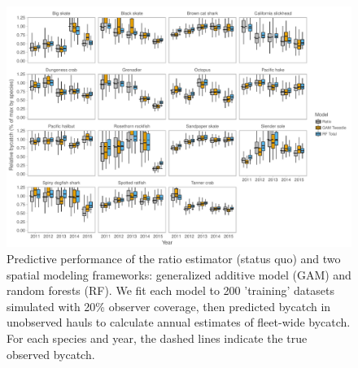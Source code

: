 \documentclass[]{article}
\begin{document}
\begin{landscape}
\begin{figure}

{\centering \includegraphics[width=10in]{bycatch_sim_paper_sepsupp_files/figure-latex/model-comparison-byyear-catch-1} 

}

\caption{Predictive performance of the ratio estimator (status quo) and two spatial modeling frameworks: generalized additive model (GAM) and random forests (RF). We fit each model to 200 'training' datasets simulated with 20\% observer coverage, then predicted bycatch in unobserved hauls to calculate annual estimates of fleet-wide bycatch. For each species and year, the dashed lines indicate the true observed bycatch.}\label{fig:model-comparison-byyear-catch}
\end{figure}
\end{landscape}

\pagebreak
\end{document}

